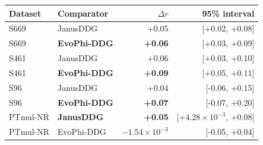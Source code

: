 \begin{tabular}{llrr}\toprule Dataset & Comparator & $\Delta r$ & 95\% interval\\\midrule
S669 & JanusDDG & +0.05 & [+0.02, +0.08] \\
S669 & \textbf{EvoPhi-DDG} & \textbf{+0.06} & [+0.03, +0.09] \\
S461 & JanusDDG & +0.06 & [+0.03, +0.10] \\
S461 & \textbf{EvoPhi-DDG} & \textbf{+0.09} & [+0.05, +0.11] \\
S96 & JanusDDG & +0.04 & [-0.06, +0.15] \\
S96 & \textbf{EvoPhi-DDG} & \textbf{+0.07} & [-0.07, +0.20] \\
PTmul-NR & \textbf{JanusDDG} & \textbf{+0.05} & [$+4.28\times10^{-3}$, +0.08] \\
PTmul-NR & EvoPhi-DDG & $-1.54\times10^{-3}$ & [-0.05, +0.04] \\
\bottomrule\end{tabular}
